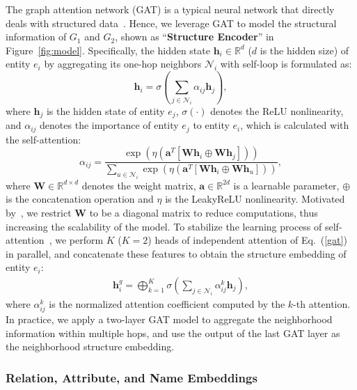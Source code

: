 \documentclass[11pt]{article}
\begin{document}
The graph attention network (GAT) is a typical neural network that directly deals with structured data~\cite{velivckovic2018graph}.
Hence, we leverage GAT to model the structural information of $G_1$ and $G_2$, shown as ``\textbf{Structure Encoder}'' in Figure~\ref{fig:model}.
Specifically, the hidden state $\bm{h}_i\in\mathbb{R}^d$ ($d$ is the hidden size) of entity $e_i$ by aggregating its one-hop neighbors $\mathcal{N}_i$ with self-loop is formulated as:
\begin{equation}
    \bm{h}_i = 
    \textstyle\sigma\left(\sum_{j\in{\mathcal{N}_i}}\alpha_{ij}\bm{h}_j\right),
    \label{gat}
\end{equation}
where $\bm{h}_j$ is the hidden state of entity $e_j$, $\sigma(\cdot)$ denotes the ReLU nonlinearity, and $\alpha_{ij}$ denotes the importance of entity $e_j$ to entity $e_i$, which is calculated with the self-attention:
\begin{equation}
    \alpha_{ij} = 
    \frac{
    \exp\left(\eta\left(\mathbf{a}^T[\mathbf{W} \bm{h}_i \oplus \mathbf{W} \bm{h}_j]\right)\right)
    }{
    \sum_{u\in\mathcal{N}_i}\exp\left(\eta\left(\mathbf{a}^T[\mathbf{W} \bm{h}_i \oplus \mathbf{W} \bm{h}_u]\right)\right)
    },
\end{equation}
where $\mathbf{W}\in\mathbb{R}^{d\times d}$ denotes the weight matrix, $\mathbf{a}\in\mathbb{R}^{2d}$ is a learnable parameter, $\oplus$ is the concatenation operation and $\eta$ is the LeakyReLU nonlinearity.
Motivated by~\cite{li2019semi}, we restrict $\mathbf{W}$ to be a diagonal matrix to reduce computations, thus increasing the scalability of the model.
To stabilize the learning process of self-attention~\cite{velivckovic2018graph}, we perform $K$ ($K=2$) heads of independent attention of Eq.~(\ref{gat}) in parallel, and concatenate these features to obtain the structure embedding of entity $e_i$:
\begin{gather}
    \bm{h}^g_i = \bigoplus^{K}_{k=1} \textstyle\sigma\left(\sum_{j\in{\mathcal{N}_i}}\alpha^{k}_{ij}\bm{h}_j\right),
\end{gather}
where $\alpha^{k}_{ij}$ is the normalized attention coefficient computed by the $k$-th attention.
In practice, we apply a two-layer GAT model to aggregate the neighborhood information within multiple hops, and use the output of the last GAT layer as the neighborhood structure embedding.


\subsubsection{Relation, Attribute, and Name Embeddings}
\end{document}
